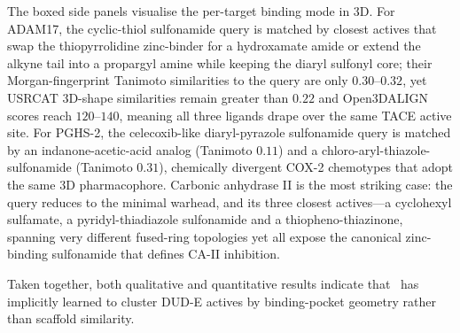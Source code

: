  

The boxed side panels visualise the per-target binding mode in 3D. For ADAM17, the cyclic-thiol sulfonamide query is matched by closest actives that swap the thiopyrrolidine zinc-binder for a hydroxamate amide or extend the alkyne tail into a propargyl amine while keeping the diaryl sulfonyl core; their Morgan-fingerprint Tanimoto similarities to the query are only $0.30$--$0.32$, yet USRCAT 3D-shape similarities remain greater than $0.22$ and Open3DALIGN scores reach $120$--$140$, meaning all three ligands drape over the same TACE active site. For PGHS-2, the celecoxib-like diaryl-pyrazole sulfonamide query is matched by an indanone-acetic-acid analog (Tanimoto $0.11$) and a chloro-aryl-thiazole-sulfonamide (Tanimoto $0.31$), chemically divergent COX-2 chemotypes that adopt the same 3D pharmacophore. Carbonic anhydrase II is the most striking case: the query reduces to the minimal  warhead, and its three closest actives---a cyclohexyl sulfamate, a pyridyl-thiadiazole sulfonamide and a thiopheno-thiazinone, spanning very different fused-ring topologies yet all expose the canonical zinc-binding sulfonamide that defines CA-II inhibition.

 

Taken together, both qualitative and quantitative results indicate that \projName~has implicitly learned to cluster DUD-E actives by binding-pocket geometry rather than scaffold similarity.


 



 



 


